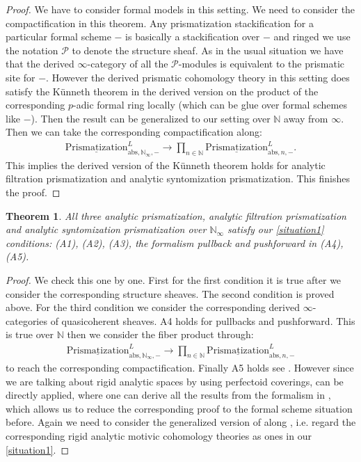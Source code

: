 \documentclass[12pt]{article}
\newtheorem{theorem}{Theorem}
\theoremstyle{definition}
\begin{document}
\begin{proof}
We have to consider formal models in this setting. We need to consider the compactification in this theorem. Any prismatization stackification for a particular formal scheme $-$ is basically a stackification over $-$ and ringed we use the notation $\mathcal{P}$ to denote the structure sheaf. As in the usual situation we have that the derived $\infty$-category of all the $\mathcal{P}$-modules is equivalent to the prismatic site for $-$. However the derived prismatic cohomology theory in this setting does satisfy the K\"unneth theorem in the derived version on the product of the corresponding $p$-adic formal ring locally (which can be glue over formal schemes like $-$). Then the result can be generalized to our setting over $\mathbb{N}$ away from $\infty$. Then we can take the corresponding compactification along:
\begin{align}
{\underline{\mathrm{Prismatization}}}^L_{\mathrm{abs},\mathbb{N}_\infty,-}\rightarrow  \prod_{n\in \mathbb{N}} {\underline{\mathrm{Prismatization}}}^L_{\mathrm{abs},n,-}.
\end{align}
This implies the derived version of the K\"unneth theorem holds for analytic filtration prismatization and analytic syntomization prismatization. This finishes the proof.
\end{proof}

\begin{theorem}
All three analytic prismatization, analytic filtration prismatization and analytic syntomization prismatization over $\mathbb{N}_\infty$ satisfy our \cref{situation1} conditions: (A1), (A2), (A3), the formalism pullback and pushforward in (A4), (A5).
\end{theorem}


\begin{proof}
We check this one by one. First for the first condition it is true after we consider the corresponding structure sheaves. The second condition is proved above. For the third condition we consider the corresponding derived $\infty$-categories of quasicoherent sheaves. A4 holds for pullbacks and pushforward. This is true over $\mathbb{N}$ then we consider the fiber product through:
\begin{align}
{\underline{\mathrm{Prismatization}}}^L_{\mathrm{abs},\mathbb{N}_\infty,-}\rightarrow  \prod_{n\in \mathbb{N}} {\underline{\mathrm{Prismatization}}}^L_{\mathrm{abs},n,-}
\end{align}
to reach the corresponding compactification. Finally A5 holds see \cite[Chapter 4, in particular 4.7, 4.8, 4.9, 4.10]{3A}. However since we are talking about rigid analytic spaces by using perfectoid coverings, \cite{3A} can be directly applied, where one can derive all the results from the formalism in \cite{3A}, which allows us to reduce the corresponding proof to the formal scheme situation before. Again we need to consider the generalized version of \cite{3A} along \cite{3S}, i.e. regard the corresponding rigid analytic motivic cohomology theories as ones in our \cref{situation1}.
\end{proof}
\end{document}
